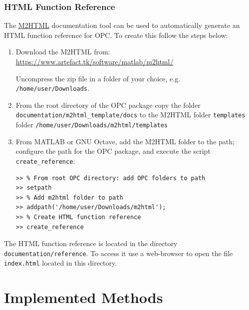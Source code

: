 \documentclass{book}
\begin{document}
\subsection{HTML Function Reference}

The
%
\href{https://www.artefact.tk/software/matlab/m2html/}{M2HTML}
%
documentation tool can be used to automatically generate an HTML function
reference for OPC.  To create this follow the steps below:

\begin{enumerate}

\item Download the M2HTML from:
%
\url{https://www.artefact.tk/software/matlab/m2html/}

Uncompress the zip file in a folder of your choice, e.g.
{\tt /home/user/Downloads}.

\item From the root directory of the OPC package copy the folder
{\tt documentation/m2html\_template/docs} 
%
to the M2HTML folder {\tt templates} folder
{\tt /home/user/Downloads/m2html/templates}


\item From MATLAB or GNU Octave, add the M2HTML folder to the path;
configure the path for the OPC package, and execute
the script {\tt create\_reference}:

\begin{verbatim}
>> % From root OPC directory: add OPC folders to path 
>> setpath
>> % Add m2html folder to path
>> addpath('/home/user/Downloads/m2html');
>> % Create HTML function reference
>> create_reference
\end{verbatim}

\end{enumerate}

\noindent
%
The HTML function reference is located in the directory {\tt
documentation/reference}.  To access it use a web-browser to open the file {\tt
index.html} located in this directory.





\chapter{Implemented Methods}
\end{document}
